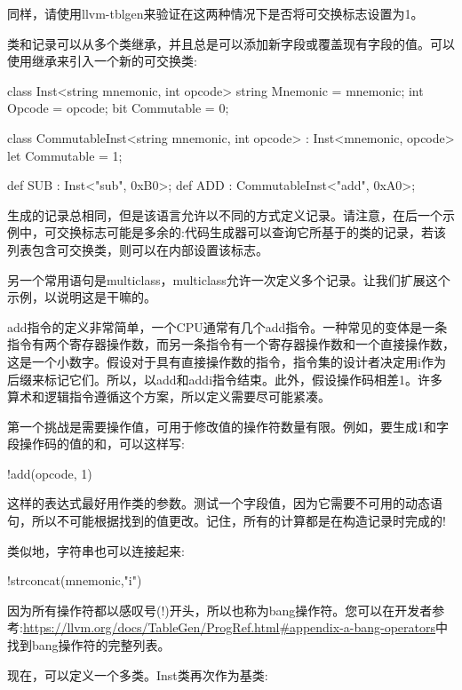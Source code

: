 同样，请使用llvm-tblgen来验证在这两种情况下是否将可交换标志设置为1。

类和记录可以从多个类继承，并且总是可以添加新字段或覆盖现有字段的值。可以使用继承来引入一个新的可交换类:

\begin{shell}
class Inst<string mnemonic, int opcode> {
    string Mnemonic = mnemonic;
    int Opcode = opcode;
    bit Commutable = 0;
}

class CommutableInst<string mnemonic, int opcode>
    : Inst<mnemonic, opcode> {
    let Commutable = 1;
}

def SUB : Inst<"sub", 0xB0>;
def ADD : CommutableInst<"add", 0xA0>;
\end{shell}

生成的记录总相同，但是该语言允许以不同的方式定义记录。请注意，在后一个示例中，可交换标志可能是多余的:代码生成器可以查询它所基于的类的记录，若该列表包含可交换类，则可以在内部设置该标志。


另一个常用语句是multiclass，multiclass允许一次定义多个记录。让我们扩展这个示例，以说明这是干嘛的。

add指令的定义非常简单，一个CPU通常有几个add指令。一种常见的变体是一条指令有两个寄存器操作数，而另一条指令有一个寄存器操作数和一个直接操作数，这是一个小数字。假设对于具有直接操作数的指令，指令集的设计者决定用i作为后缀来标记它们。所以，以add和addi指令结束。此外，假设操作码相差1。许多算术和逻辑指令遵循这个方案，所以定义需要尽可能紧凑。

第一个挑战是需要操作值，可用于修改值的操作符数量有限。例如，要生成1和字段操作码的值的和，可以这样写:

\begin{shell}
!add(opcode, 1)
\end{shell}

这样的表达式最好用作类的参数。测试一个字段值，因为它需要不可用的动态语句，所以不可能根据找到的值更改。记住，所有的计算都是在构造记录时完成的!

类似地，字符串也可以连接起来:

\begin{shell}
!strconcat(mnemonic,"i")
\end{shell}

因为所有操作符都以感叹号(!)开头，所以也称为bang操作符。您可以在开发者参考:\url{https://llvm.org/docs/TableGen/ProgRef.html#appendix-a-bang-operators}中找到bang操作符的完整列表。

现在，可以定义一个多类。Inst类再次作为基类:


